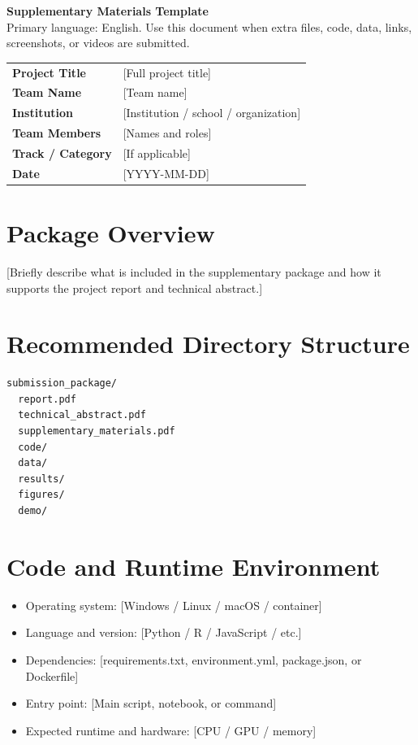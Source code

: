 \documentclass[11pt,a4paper]{article}
\newcommand{\placeholder}[1]{[#1]}
\begin{document}
\begin{center}
{\LARGE\bfseries Supplementary Materials Template}\\[0.5em]
{\large Primary language: English. Use this document when extra files, code, data, links, screenshots, or videos are submitted.}\\[1.5em]
\end{center}

\begin{tabularx}{\textwidth}{>{\bfseries}p{}X}
\toprule
Project Title & \placeholder{Full project title}\\
Team Name & \placeholder{Team name}\\
Institution & \placeholder{Institution / school / organization}\\
Team Members & \placeholder{Names and roles}\\
Track / Category & \placeholder{If applicable}\\
Date & \placeholder{YYYY-MM-DD}\\
\bottomrule
\end{tabularx}

\section{Package Overview}
\placeholder{Briefly describe what is included in the supplementary package and how it supports the project report and technical abstract.}

\section{Recommended Directory Structure}
\begin{verbatim}
submission_package/
  report.pdf
  technical_abstract.pdf
  supplementary_materials.pdf
  code/
  data/
  results/
  figures/
  demo/
\end{verbatim}

\section{Code and Runtime Environment}
\begin{itemize}
  \item Operating system: \placeholder{Windows / Linux / macOS / container}
  \item Language and version: \placeholder{Python / R / JavaScript / etc.}
  \item Dependencies: \placeholder{requirements.txt, environment.yml, package.json, or Dockerfile}
  \item Entry point: \placeholder{Main script, notebook, or command}
  \item Expected runtime and hardware: \placeholder{CPU / GPU / memory}
\end{itemize}
\end{document}
